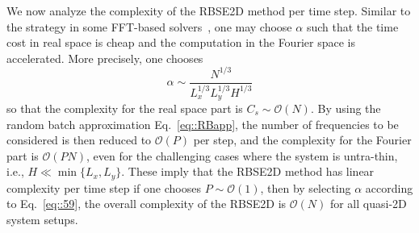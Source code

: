 We now analyze the complexity of the RBSE2D method per time step. 
Similar to the strategy in some FFT-based solvers~\cite{deserno1998mesh,lindbo2012fast}, one may choose $\alpha$ such that the time cost in real space is cheap and the computation in the Fourier space is accelerated. 
More precisely, one chooses
\begin{equation}\label{eq::59}
	\alpha\sim\frac{N^{1/3}}{L_x^{1/3}L_y^{1/3} H^{1/3}}
\end{equation}
so that the complexity for the real space part is $C_{s}\sim \mathcal{O}(N)$. 
By using the random batch approximation Eq.~\eqref{eq::RBapp}, the number of frequencies to be considered is then reduced to $\mathcal{O}(P)$ per step, and  the complexity for the Fourier part is $\mathcal{O}(PN)$, even for the challenging cases where the system is untra-thin, i.e., $H \ll \min\{L_x,L_y\}$.
These imply that the RBSE2D method has linear complexity per time step if one chooses $P\sim \mathcal{O}(1)$, then by selecting $\alpha$ according to Eq.~\eqref{eq::59}, 
the overall complexity of the RBSE2D is $\mathcal{O}(N)$ for all quasi-2D system setups.

